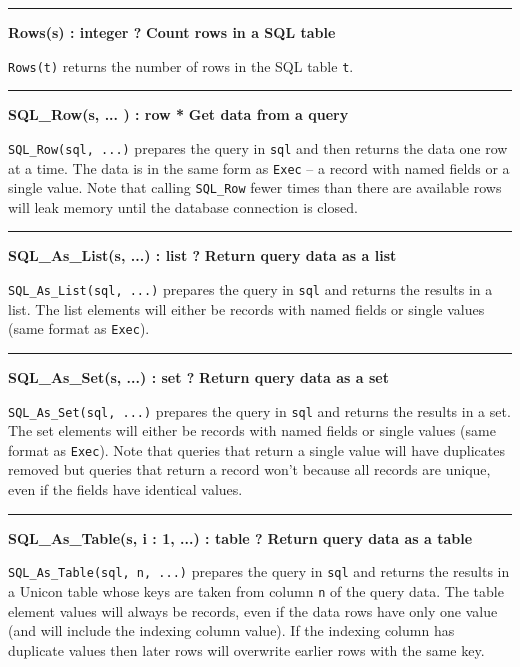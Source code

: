 \bigskip\hrule\vspace{0.1cm}
\noindent
{\bf Rows(s) : integer ? } \hfill {\bf Count rows in a SQL table}

\noindent
\texttt{Rows(t)} returns the number of rows in the SQL table \texttt{t}.

\bigskip\hrule\vspace{0.1cm}
\noindent
{\bf SQL\_Row(s, ... ) : row * } \hfill {\bf Get data from a query}

\noindent
\texttt{SQL\_Row(sql, ...)} prepares the query in \texttt{sql} and then returns
the data one row at a time. The data is in the same form as \texttt{Exec} -- a
record with named fields or a single value.  Note that calling \texttt{SQL\_Row}
fewer times than there are available rows will leak memory until the database
connection is closed.

\bigskip\hrule\vspace{0.1cm}
\noindent
{\bf SQL\_As\_List(s, ...) : list ? } \hfill {\bf Return query data as a list}

\noindent
\texttt{SQL\_As\_List(sql, ...)}  prepares the query in \texttt{sql} and returns
the results in a list. The list elements will either be records with named
fields or single values (same format as \texttt{Exec}).

\bigskip\hrule\vspace{0.1cm}
\noindent
{\bf SQL\_As\_Set(s, ...) : set ? } \hfill {\bf Return query data as a set}

\noindent
\texttt{SQL\_As\_Set(sql, ...)}  prepares the query in \texttt{sql} and returns
the results in a set. The set elements will either be records with named
fields or single values (same format as \texttt{Exec}).
Note that queries that return a single value will have duplicates removed but
queries that return a record won't because all records are unique, even if the
fields have identical values.

\bigskip\hrule\vspace{0.1cm}
\noindent
{\bf SQL\_As\_Table(s, i : 1, ...) : table ? } \hfill {\bf Return query data as a table}

\noindent
\texttt{SQL\_As\_Table(sql, n, ...)}  prepares the query in \texttt{sql} and
returns the results in a Unicon table whose keys are taken from column \texttt{n} of
the query data. The table element values will always be records, even if the
data rows have only one value (and will include the indexing column value). If
the indexing column has duplicate values then later rows will overwrite earlier
rows with the same key.

